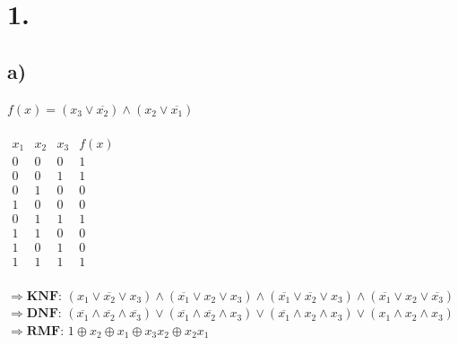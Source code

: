\documentclass[a4paper]{scrartcl}
\title{\titleinfo}
\author{Tronje Krabbe 6435002, The-Vinh Jackie Huynh 6388888,\\Arne Struck 6326505}
\date{\today}
\begin{document}
\maketitle
\notag
\section{1.}
	\subsection{a)}
		\(f(x)=(x_3\vee \overline{x_2})\land (x_2 \vee \overline{x_1})\) \\ \\
		\(
		\begin{array}{c|c|c||c}
				x_1&x_2&x_3&f(x) \\ \hline
				0&0&0&1 \\
				0&0&1&1 \\
				0&1&0&0 \\
				1&0&0&0 \\
				0&1&1&1 \\
				1&1&0&0 \\
				1&0&1&0 \\
				1&1&1&1
		\end{array}
		\) \\ \\
		\(\Rightarrow \textbf{KNF: } 
		(x_1\vee \overline{x_2}\vee x_3)\land
		(\overline{x_1}\vee x_2\vee x_3)\land
		(\overline{x_1}\vee\overline{x_2}\vee x_3)\land
		(\overline{x_1}\vee x_2\vee \overline{x_3})\) \\
		\(\Rightarrow \textbf{DNF: }
		(\overline{x_1}\land\overline{x_2}\land\overline{x_3})\vee
		(\overline{x_1}\land\overline{x_2}\land x_3)\vee
		(\overline{x_1}\land x_2\land x_3)\vee
		(x_1\land x_2\land x_3)\) \\
		\(\Rightarrow\textbf{RMF: }1 \oplus x_2 \oplus x_1 \oplus x_3x_2 \oplus x_2x_1 \) \\ \\
		\newpage
\end{document}
